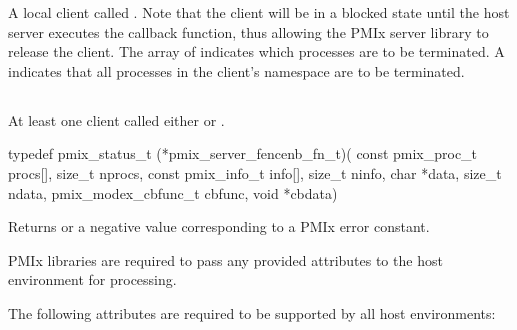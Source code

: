\descr

A local client called .
Note that the client will be in a blocked state until the host server executes the callback function, thus allowing the \ac{PMIx} server library to release the client.
The array of  indicates which processes are to be terminated.
A  indicates that all processes in the client's namespace are to be terminated.


\subsection{}

\summary

At least one client called either  or .

\format

\cspecificstart
\begin{codepar}
typedef pmix_status_t (*pmix_server_fencenb_fn_t)(
                             const pmix_proc_t procs[],
                             size_t nprocs,
                             const pmix_info_t info[],
                             size_t ninfo,
                             char *data, size_t ndata,
                             pmix_modex_cbfunc_t cbfunc,
                             void *cbdata)
\end{codepar}
\cspecificend

\begin{arglist}
\end{arglist}

Returns  or a negative value corresponding to a PMIx error constant.

\reqattrstart
\ac{PMIx} libraries are required to pass any provided attributes to the host environment for processing.

The following attributes are required to be supported by all host environments:

